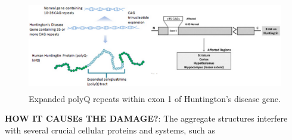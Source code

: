 \begin{figure}[htb]
  \centerline{\includegraphics[height=4cm]{./images/HTT_polyQ.eps}}
  \caption{Expanded polyQ repeats within exon 1 of Huntington's disease
  gene.}\label{fig:HTT_polyQ}
\end{figure}

{\bf HOW IT CAUSEs THE DAMAGE?}: The aggregate structures interfere with several
crucial cellular proteins and systems, such as 
